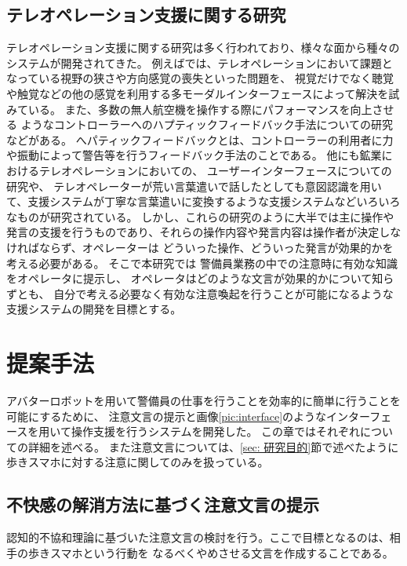 \documentclass{kuisthesis}
\begin{document}
\section{テレオペレーション支援に関する研究}
テレオペレーション支援に関する研究は多く行われており、様々な面から種々のシステムが開発されてきた。
例えば\cite{chen2007human,triantafyllidis2020study}では、テレオペレーションにおいて課題となっている視野の狭さや方向感覚の喪失といった問題を、
視覚だけでなく聴覚や触覚などの他の感覚を利用する多モーダルインターフェースによって解決を試みている。
また、多数の無人航空機を操作する際にパフォーマンスを向上させる
ようなコントローラーへのハプティックフィードバック手法についての研究\cite{son2011measuring}などがある。
へパティックフィードバックとは、コントローラーの利用者に力や振動によって警告等を行うフィードバック手法のことである。
他にも鉱業におけるテレオペレーションにおいての、
ユーザーインターフェースについての研究\cite{hainsworth2001teleoperation}や、
テレオペレーターが荒い言葉遣いで話したとしても意図認識を用いて、支援システムが丁寧な言葉遣いに変換するような支援システム\cite{Daneshmand2023}などいろいろなものが研究されている。
しかし、これらの研究のように大半では主に操作や発言の支援を行うものであり、それらの操作内容や発言内容は操作者が決定しなければならず、オペレーターは
どういった操作、どういった発言が効果的かを考える必要がある。
そこで本研究では
警備員業務の中での注意時に有効な知識をオペレータに提示し、
オペレータはどのような文言が効果的かについて知らずとも、
自分で考える必要なく有効な注意喚起を行うことが可能になるような
支援システムの開発を目標とする。


\chapter{提案手法}



アバターロボットを用いて警備員の仕事を行うことを効率的に簡単に行うことを可能にするために、
注意文言の提示と画像\ref{pic:interface}のようなインターフェースを用いて操作支援を行うシステムを開発した。
この章ではそれぞれについての詳細を述べる。
また注意文言については、\ref{sec: 研究目的}節で述べたように歩きスマホに対する注意に関してのみを扱っている。


\section{不快感の解消方法に基づく注意文言の提示}
認知的不協和理論に基づいた注意文言の検討を行う。ここで目標となるのは、相手の歩きスマホという行動を
なるべくやめさせる文言を作成することである。
\end{document}
